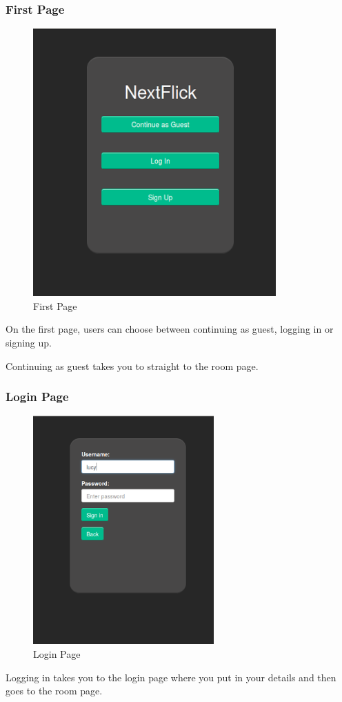 \documentclass{article}
\begin{document}
\subsubsection{First Page}
\begin{figure}[H]
\centering
\caption{First Page}
\label{sec:sysarchitecture}
\includegraphics[scale=0.5]{firstpage}
\end{figure}
On the first page, users can choose between continuing as guest, logging in or signing up.

Continuing as guest takes you to straight to the room page.
\subsubsection{Login Page}
\begin{figure}[H]
\centering
\caption{Login Page}
\label{sec:sysarchitecture}
\includegraphics[scale=0.60]{loginpage}
\end{figure}
Logging in takes you to the login page where you put in your details and then goes to the room page. 
\end{document}
